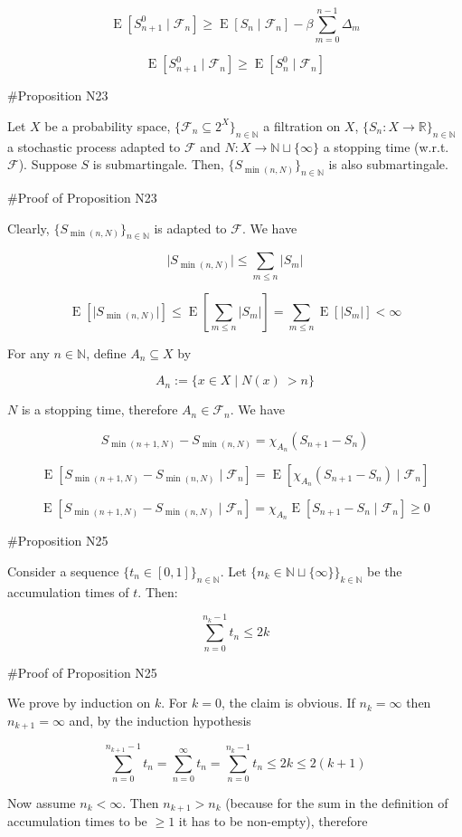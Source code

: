 \documentclass[a4paper]{article}
\DeclareMathOperator{\E}{E}
\newcommand{\Nats}{\mathbb{N}}
\newcommand{\Reals}{\mathbb{R}}
\newcommand{\Sq}[2]{\{#1\}_{#2 \in \Nats}}
\newcommand{\Sqn}[1]{\Sq{#1}{n}}
\newcommand{\Abs}[1]{\lvert #1 \rvert}
\newcommand{\F}{\mathcal{F}}
\begin{document}
$$\E[S^0_{n+1} \mid \F_n] \geq \E[S_{n} \mid \F_n] - \beta \sum_{m = 0}^{n - 1} \Delta_m$$

$$\E[S^0_{n+1} \mid \F_n] \geq \E[S^0_{n} \mid \F_n]$$

\#Proposition N23

Let ${X}$ be a probability space, ${\Sqn{\F_n \subseteq 2^X}}$ a filtration on ${X}$, ${\Sqn{S_n: X \rightarrow \Reals}}$ a stochastic process adapted to ${\F}$ and ${N: X \rightarrow \Nats \sqcup \{\infty\}}$ a stopping time (w.r.t. ${\F}$). Suppose ${S}$ is submartingale. Then, ${\Sqn{S_{\min(n,N)}}}$ is also submartingale.

\#Proof of Proposition N23

Clearly, ${\Sqn{S_{\min(n,N)}}}$ is adapted to ${\F}$. We have

$$\Abs{S_{\min(n,N)}} \leq \sum_{m \leq n} \Abs{S_m}$$

$$\E[\Abs{S_{\min(n,N)}}] \leq \E[\sum_{m \leq n} \Abs{S_m}] = \sum_{m \leq n} \E[\Abs{S_m}] < \infty$$

For any ${n \in \Nats}$, define ${A_n \subseteq X}$ by

$$A_n:=\{x \in X \mid N(x)\ > n\}$$

${N}$ is a stopping time, therefore ${A_n \in \F_n}$. We have 

$${S_{\min(n+1,N)} - S_{\min(n,N)} = \chi_{A_n} (S_{n+1} - S_n)}$$

$${\E[S_{\min(n+1,N)} - S_{\min(n,N)} \mid \F_n] = \E[\chi_{A_n} (S_{n+1} - S_n) \mid \F_n]}$$

$${\E[S_{\min(n+1,N)} - S_{\min(n,N)} \mid \F_n] = \chi_{A_n} \E[ S_{n+1} - S_n \mid \F_n] \geq 0}$$

\#Proposition N25

Consider a sequence ${\{t_n \in [0,1]\}_{n \in \Nats}}$. Let ${\{n_k \in \Nats \sqcup \{\infty\}\}_{k \in \Nats}}$ be the accumulation times of ${t}$. Then:

$$\sum_{n = 0}^{n_k - 1} t_n \leq 2k$$

\#Proof of Proposition N25

We prove by induction on ${k}$. For ${k = 0}$, the claim is obvious. If ${n_k = \infty}$ then ${n_{k+1}=\infty}$ and, by the induction hypothesis

$$\sum_{n = 0}^{n_{k+1} - 1} t_n = \sum_{n = 0}^{\infty} t_n = \sum_{n = 0}^{n_k - 1} t_n \leq 2k \leq 2(k+1)$$

Now assume ${n_k < \infty}$. Then ${n_{k+1} > n_k}$ (because for the sum in the definition of accumulation times to be ${\geq 1}$ it has to be non-empty), therefore
\end{document}

